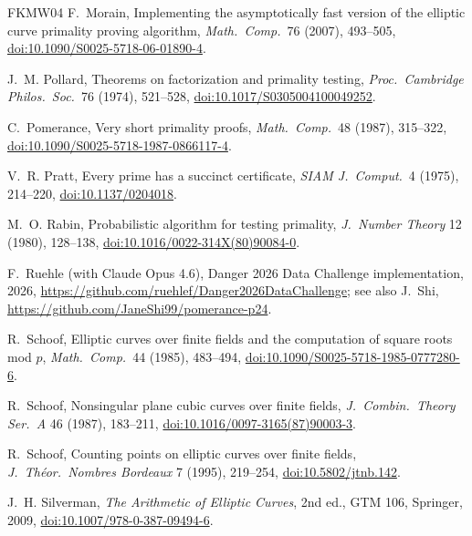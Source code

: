 \documentclass[11pt]{amsart}
\theoremstyle{plain}
\theoremstyle{definition}
\theoremstyle{remark}
\begin{document}
\begin{thebibliography}{FKMW04}
 F.~Morain, Implementing the asymptotically fast version of the elliptic curve
primality proving algorithm, \emph{Math.\ Comp.}\ 76 (2007), 493--505, \href{https://doi.org/10.1090/S0025-5718-06-01890-4}{doi:10.1090/S0025-5718-06-01890-4}.

 J.~M. Pollard, Theorems on factorization and primality testing,
\emph{Proc.\ Cambridge Philos.\ Soc.}\ 76 (1974), 521--528, \href{https://doi.org/10.1017/S0305004100049252}{doi:10.1017/S0305004100049252}.

 C.~Pomerance, Very short primality proofs, \emph{Math.\ Comp.}\ 48 (1987),
315--322, \href{https://doi.org/10.1090/S0025-5718-1987-0866117-4}{doi:10.1090/S0025-5718-1987-0866117-4}.

 V.~R. Pratt, Every prime has a succinct certificate, \emph{SIAM J.~Comput.}\ 4
(1975), 214--220, \href{https://doi.org/10.1137/0204018}{doi:10.1137/0204018}.

 M.~O. Rabin, Probabilistic algorithm for testing primality, \emph{J.~Number
Theory} 12 (1980), 128--138, \href{https://doi.org/10.1016/0022-314X(80)90084-0}{doi:10.1016/0022-314X(80)90084-0}.

 F.~Ruehle (with Claude Opus 4.6), Danger 2026 Data Challenge implementation,
2026, \url{https://github.com/ruehlef/Danger2026DataChallenge}; see also J.~Shi,
\url{https://github.com/JaneShi99/pomerance-p24}.

 R.~Schoof, Elliptic curves over finite fields and the computation of square
roots mod $p$, \emph{Math.\ Comp.}\ 44 (1985), 483--494, \href{https://doi.org/10.1090/S0025-5718-1985-0777280-6}{doi:10.1090/S0025-5718-1985-0777280-6}.

 R.~Schoof, Nonsingular plane cubic curves over finite fields, \emph{J.~Combin.\
Theory Ser.~A} 46 (1987), 183--211, \href{https://doi.org/10.1016/0097-3165(87)90003-3}{doi:10.1016/0097-3165(87)90003-3}.

 R.~Schoof, Counting points on elliptic curves over finite fields,
\emph{J.~Th\'eor.\ Nombres Bordeaux} 7 (1995), 219--254, \href{https://doi.org/10.5802/jtnb.142}{doi:10.5802/jtnb.142}.

 J.~H. Silverman, \emph{The Arithmetic of Elliptic Curves}, 2nd ed., GTM 106,
Springer, 2009, \href{https://doi.org/10.1007/978-0-387-09494-6}{doi:10.1007/978-0-387-09494-6}.


\end{thebibliography}
\end{document}
